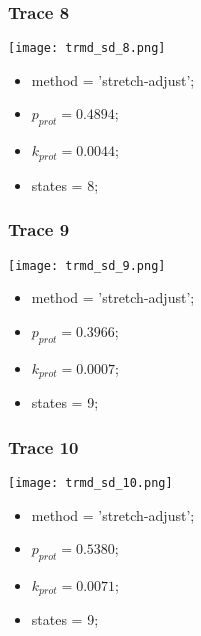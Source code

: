 \subsubsection{Trace 8}
\begin{minipage}[c]{0.7\textwidth}
    \texttt{[image: trmd\_sd\_8.png]}
\end{minipage}
\hfill
\begin{minipage}[c]{0.45\textwidth}
    \begin{itemize}
        \item method = 'stretch-adjust';
        \item $p_{prot}=0.4894$;
        \item $k_{prot}=0.0044$;
        \item states = 8;
    \end{itemize}
\end{minipage}

\subsubsection{Trace 9}
\begin{minipage}[c]{0.7\textwidth}
    \texttt{[image: trmd\_sd\_9.png]}
\end{minipage}
\hfill
\begin{minipage}[c]{0.45\textwidth}
    \begin{itemize}
        \item method = 'stretch-adjust';
        \item $p_{prot}=0.3966$;
        \item $k_{prot}=0.0007$;
        \item states = 9;
    \end{itemize}
\end{minipage}

\subsubsection{Trace 10}
\begin{minipage}[c]{0.7\textwidth}
    \texttt{[image: trmd\_sd\_10.png]}
\end{minipage}
\hfill
\begin{minipage}[c]{0.45\textwidth}
    \begin{itemize}
        \item method = 'stretch-adjust';
        \item $p_{prot}=0.5380$;
        \item $k_{prot}=0.0071$;
        \item states = 9;
    \end{itemize}
\end{minipage}


